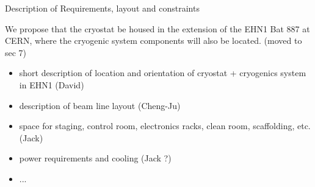 Description of Requirements, layout and constraints

We propose that the cryostat be housed in the extension of the EHN1 Bat 887 at CERN, where the cryogenic system components will also be located. (moved to sec 7)

\begin{itemize}
\item short description of location and orientation of cryostat + cryogenics system in EHN1 (David)

\item description of beam line layout (Cheng-Ju)

\item space for staging, control room, electronics racks, clean room, scaffolding, etc. (Jack)

\item power requirements and cooling  (Jack ?)

\item ...

\end{itemize}
